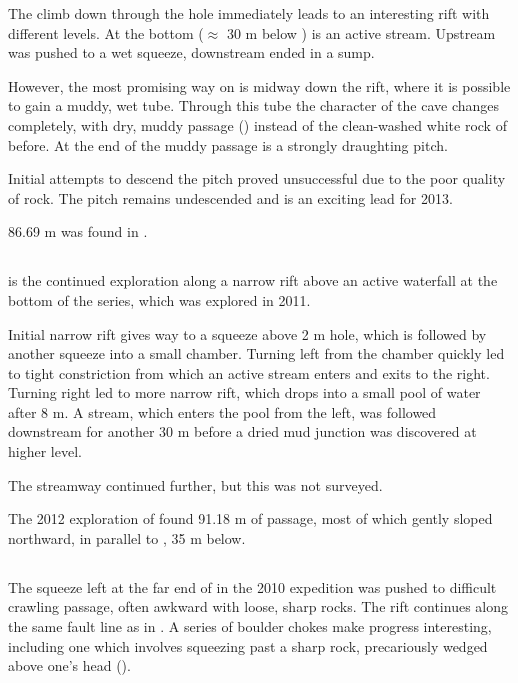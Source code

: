 The climb down through the hole immediately leads to an interesting rift
with different levels. At the bottom ($\approx$ 30 m below
) is an active stream. Upstream was pushed to a
wet squeeze, downstream ended in a sump.

However, the most promising way on is midway down the rift, where it is
possible to gain a muddy, wet tube. Through this tube the character of
the cave changes completely, with dry, muddy passage () instead
of the clean-washed white rock of before. At the end of the muddy
passage is a strongly draughting pitch.

Initial attempts to descend the pitch proved unsuccessful due to the
poor quality of rock. The pitch remains undescended and is an exciting
lead for 2013.

86.69 m was found in .


\subsection{}

 is the continued exploration along a narrow rift above
an active waterfall at the bottom of the  series,
which was explored in 2011.

Initial narrow rift gives way to a squeeze above 2 m hole, which is
followed by another squeeze into a small chamber. Turning left from the
chamber quickly led to tight constriction from which an active stream
enters and exits to the right. Turning right led to more narrow rift,
which drops into a small pool of water after 8 m. A stream, which enters
the pool from the left, was followed downstream for another 30 m before
a dried mud junction was discovered at higher level.

The streamway continued further, but this was not surveyed.

The 2012 exploration of  found 91.18 m of passage, most
of which gently sloped northward, in parallel to , 35 m below.


\subsection{}

The squeeze left at the far end of  in the 2010
expedition was pushed to difficult crawling passage, often awkward with
loose, sharp rocks. The rift continues along the same fault line as in
. A series of boulder chokes make progress
interesting, including one which involves squeezing past a sharp rock,
precariously wedged above one's head ().


